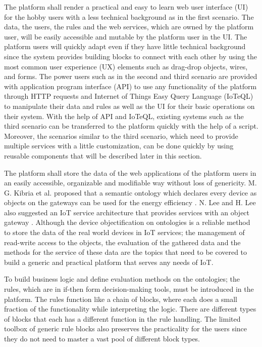 The platform shall render a practical and easy to learn web user interface (UI) for the hobby users with a less technical background as in the first scenario. The data, the users, the rules and the web services, which are owned by the platform user, will be easily accessible and mutable by the platform user in the UI. The platform users will quickly adapt even if they have little technical background since the system provides building blocks to connect with each other by using the most common user experience (UX) elements such as drag-drop objects, wires, and forms. The power users such as in the second and third scenario are provided with application program interface (API) to use any functionality of the platform through HTTP requests and Internet of Things Easy Query Language (IoTeQL) to manipulate their data and rules as well as the UI for their basic operations on their system. With the help of API and IoTeQL, existing systems such as the third scenario can be transferred to the platform quickly with the help of a script. Moreover, the scenarios similar to the third scenario, which need to provide multiple services with a little customization, can be done quickly by using reusable components that will be described later in this section.

The platform shall store the data of the web applications of the platform users in an easily accessible, organizable and modifiable way without loss of genericity. M. G. Kibria et al. proposed that a semantic ontology which declares every device as objects on the gateways can be used for the energy efficiency \cite{7993747}. N. Lee and H. Lee also suggested an IoT service architecture that provides services with an object gateway \cite{6884496}. Although the device objectification on ontologies is a reliable method to store the data of the real world devices in IoT services; the management of read-write access to the objects, the evaluation of the gathered data and the methods for the service of these data are the topics that need to be covered to build a generic and practical platform that serves any needs of IoT.

To build business logic and define evaluation methods on the ontologies; the rules, which are in if-then form decision-making tools, must be introduced in the platform. The rules function like a chain of blocks, where each does a small fraction of the functionality while interpreting the logic.  There are different types of blocks that each has a different function in the rule handling. The limited toolbox of generic rule blocks also preserves the practicality for the users since they do not need to master a vast pool of different block types.

